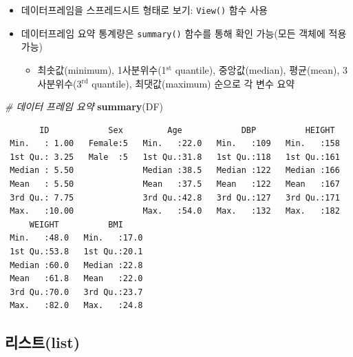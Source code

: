 \documentclass[11pt,a4paper]{book}
\newenvironment{Shaded}{\begin{snugshade}}{\end{snugshade}}
\newcommand{\KeywordTok}[1]{\textcolor[rgb]{0.13,0.29,0.53}{\textbf{#1}}}
\newcommand{\CommentTok}[1]{\textcolor[rgb]{0.56,0.35,0.01}{\textit{#1}}}
\newcommand{\NormalTok}[1]{#1}
\providecommand{\tightlist}{%
  \setlength{\itemsep}{0pt}\setlength{\parskip}{0pt}}
\theoremstyle{definition}
\theoremstyle{definition}
\theoremstyle{definition}
\theoremstyle{remark}
\begin{document}
\normalsize

\begin{itemize}
\tightlist
\item
  데이터프레임을 스프레드시트 형태로 보기: \texttt{View()} 함수 사용
\item
  데이터프레임 요약 통계량은 \texttt{summary()} 함수를 통해 확인
  가능(모든 객체에 적용 가능)

  \begin{itemize}
  \tightlist
  \item
    최솟값(minimum), 1사분위수(1\(^{\mathrm{st}}\) quantile),
    중앙값(median), 평균(mean), 3사분위수(3\(^{\mathrm{rd}}\) quantile),
    최댓값(maximum) 순으로 각 변수 요약
  \end{itemize}
\end{itemize}

\footnotesize

\begin{Shaded}
\begin{Highlighting}[]
\CommentTok{# 데이터 프레임 요약}
\KeywordTok{summary}\NormalTok{(DF)}
\end{Highlighting}
\end{Shaded}

\begin{verbatim}
       ID            Sex         Age            DBP          HEIGHT   
 Min.   : 1.00   Female:5   Min.   :22.0   Min.   :109   Min.   :158  
 1st Qu.: 3.25   Male  :5   1st Qu.:31.8   1st Qu.:118   1st Qu.:161  
 Median : 5.50              Median :38.5   Median :122   Median :166  
 Mean   : 5.50              Mean   :37.5   Mean   :122   Mean   :167  
 3rd Qu.: 7.75              3rd Qu.:42.8   3rd Qu.:127   3rd Qu.:171  
 Max.   :10.00              Max.   :54.0   Max.   :132   Max.   :182  
     WEIGHT          BMI      
 Min.   :48.0   Min.   :17.0  
 1st Qu.:53.8   1st Qu.:20.1  
 Median :60.0   Median :22.8  
 Mean   :61.8   Mean   :22.0  
 3rd Qu.:70.0   3rd Qu.:23.7  
 Max.   :82.0   Max.   :24.8  
\end{verbatim}

\normalsize

\subsection{리스트(list)}\label{list}
\end{document}
